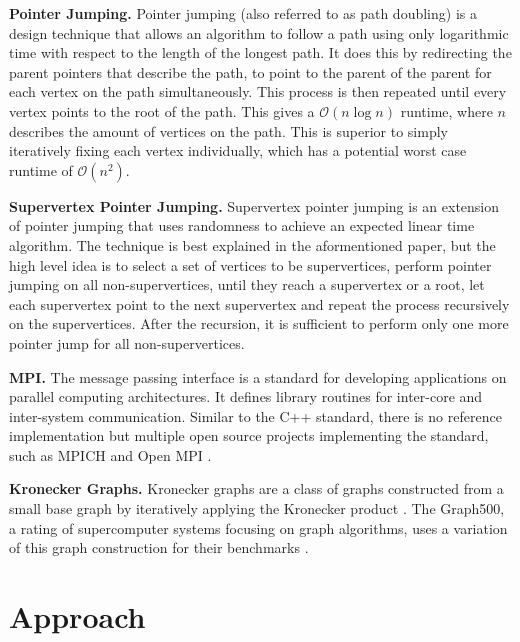 \documentclass[letterpaper]{article}
\newcommand{\bigoh}{\mathcal O}
\newcommand{\mypar}[1]{{\bf #1.}}
\begin{document}
\mypar{Pointer Jumping}
Pointer jumping \cite{jeje1992introduction} (also referred to as path doubling) is a design technique that allows an
algorithm to follow a path using only logarithmic time with respect to the length of the longest path. It does this by
redirecting the parent pointers that describe the path, to point to the parent of the parent for each vertex on the path
simultaneously. This process is then repeated until every vertex points to the root of the path. This gives a $\bigoh(n
\log n)$ runtime, where $n$ describes the amount of vertices on the path. This is superior to simply iteratively fixing
each vertex individually, which has a potential worst case runtime of $\bigoh(n^2)$.

\mypar{Supervertex Pointer Jumping}
Supervertex pointer jumping \cite{chung1996parallel} is an extension of pointer jumping that uses randomness to achieve
an expected linear time algorithm. The technique is best explained in the aformentioned paper, but the high level idea
is to select a set of vertices to be supervertices, perform pointer jumping on all non-supervertices, until they reach a
supervertex or a root, let each supervertex point to the next supervertex and repeat the process recursively on the
supervertices. After the recursion, it is sufficient to perform only one more pointer jump for all non-supervertices.

\mypar{MPI}
The message passing interface \cite{clarke1994mpi} is a standard for developing applications on parallel computing
architectures. It defines library routines for inter-core and inter-system communication. Similar to the
C++ standard, there is no reference implementation but multiple open source projects implementing the standard, such as
MPICH and Open MPI \cite{gabriel2004open}.

\mypar{Kronecker Graphs}
Kronecker graphs are a class of graphs constructed from a small base graph by iteratively applying the Kronecker product
\cite{leskovec2010kronecker}. The Graph500, a rating of supercomputer systems focusing on graph algorithms, uses a
variation of this graph construction for their benchmarks \cite{graph500}.

\section{Approach}
\label{sec:approach}
\end{document}
